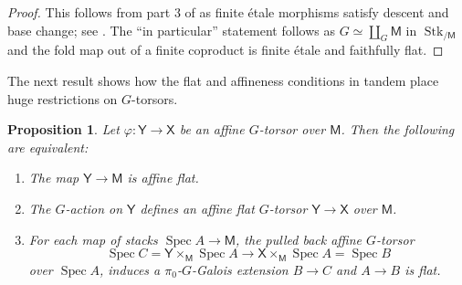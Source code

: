 \documentclass[11pt, a4paper]{article}
\DeclareMathOperator{\Spec}{Spec}
\newcommand{\1}{\mathbf{1}}
\DeclareMathOperator{\Stk}{Stk}
\newcommand{\E}{\mathbf{E}}
\newcommand{\M}{\mathsf{M}}
\newcommand{\X}{\mathsf{X}}
\newcommand{\Y}{\mathsf{Y}}
\theoremstyle{plain}
\newtheorem{prop}[equation]{Proposition}
\theoremstyle{definition}
\theoremstyle{remark}\numberwithin{equation}{section}
\begin{document}
\begin{proof}
    This follows from part 3 of  as finite étale morphisms satisfy descent and base change; see . The ``in particular'' statement follows as $G \simeq \coprod_G \M$ in $\Stk_{/\M}$ and the fold map out of a finite coproduct is finite étale and faithfully flat. 
\end{proof}

The next result shows how the flat and affineness conditions in tandem place huge restrictions on $G$-torsors.

\begin{prop}\label{pr:flatness_and_affine_torsors}
    Let $\varphi \colon \Y \to \X$ be an affine $G$-torsor over $\M$. Then the following are equivalent:
    \begin{enumerate}
        \item The map $\Y \to \M$ is affine flat.
        \item The $G$-action on $\Y$ defines an affine flat $G$-torsor $\Y \to \X$ over $\M$.
        \item For each map of stacks $\Spec A \to \M$, the pulled back affine $G$-torsor
        \[\Spec C = \Y \times_\M \Spec A \to \X \times_\M \Spec A = \Spec B\]
        over $\Spec A$, induces a $\pi_0$-$G$-Galois extension $B \to C$ and $A \to B$ is flat.
    \end{enumerate}
\end{prop}
\end{document}

